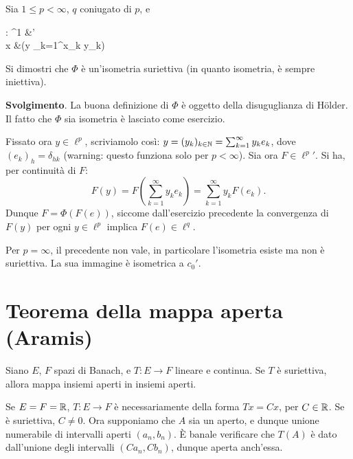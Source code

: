 \begin{exercise}
	Sia $1 \leq p < \infty$, $q$ coniugato di $p$, e
	\begin{eqalign*}
		\Phi : \ell^1 &'\\
			x &\longmapsto (y \mapsto \sum_{k=1}^\infty x_k y_k)
	\end{eqalign*}
	Si dimostri che $\Phi$ è un'isometria suriettiva (in quanto isometria, è sempre iniettiva).

	\noindent\textbf{Svolgimento}. La buona definizione di $\Phi$ è oggetto della disuguglianza di H\"older. Il fatto che $\Phi$ sia isometria è lasciato come esercizio.

	Fissato ora $y \in \ell^p$, scriviamolo così: $y=(y_k)_{k \in \mathbb{N}} = \sum_{k=1}^\infty y_k e_k$, dove $(e_k)_h = \delta_{hk}$ (warning: questo funziona solo per $p < \infty$). Sia ora $F \in {\ell^p}'$. Si ha, per continuità di $F$:
	\begin{equation*}
		F(y) = F(\sum_{k=1}^\infty y_k e_k) = \sum_{k=1}^\infty y_k F(e_k).
	\end{equation*}
	Dunque $F = \Phi(F(e))$, siccome dall'esercizio precedente la convergenza di $F(y)$ per ogni $y \in \ell^p$ implica $F(e) \in \ell^q$.
\end{exercise}

\begin{remark}
	Per $p=\infty$, il precedente non vale, in particolare l'isometria esiste ma non è suriettiva. La sua immagine è isometrica a $c_0'$.
\end{remark}

\section{Teorema della mappa aperta (Aramis)}
\begin{theorem}
	Siano $E$, $F$ spazi di Banach, e $T : E \to F$ lineare e continua. Se $T$ è suriettiva, allora mappa insiemi aperti in insiemi aperti.
\end{theorem}

\begin{example}
	Se $E = F = \mathbb{R}$, $T : E \to F$ è necessariamente della forma $Tx = Cx$, per $C \in \mathbb{R}$. Se è suriettiva, $C \neq 0$. Ora supponiamo che $A$ sia un aperto, e dunque unione numerabile di intervalli aperti $(a_n, b_n)$. È banale verificare che $T(A)$ è dato dall'unione degli intervalli $(Ca_n, Cb_n)$, dunque aperta anch'essa.
\end{example}

